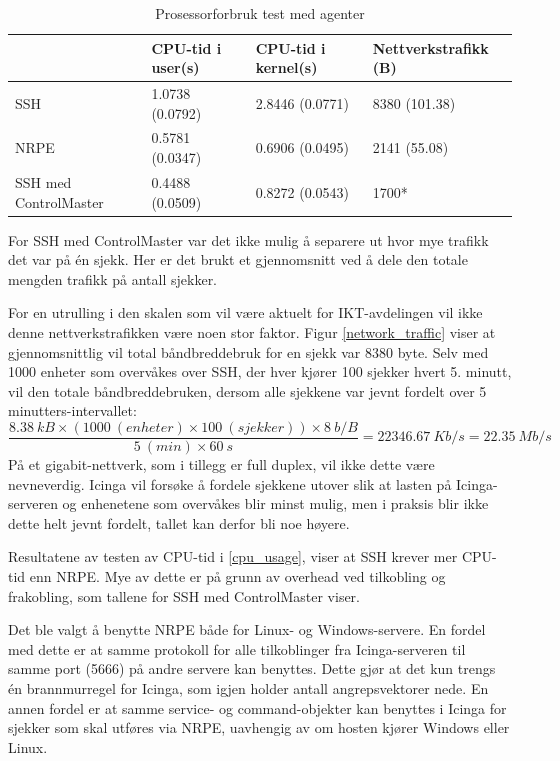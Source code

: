\begin{table}
    \begin{center}
	\begin{threeparttable}
    \begin{tabular}{| l | l | l | l |} \hline
	\ & \textbf{CPU-tid i user(s)} & \textbf{CPU-tid i kernel(s)} & \textbf{Nettverkstrafikk (B)} \\ \hline
	SSH & 1.0738 (0.0792) & 2.8446 (0.0771) & 8380 (101.38) \\ \hline
	NRPE & 0.5781 (0.0347) & 0.6906 (0.0495) & 2141 (55.08) \\ \hline
	SSH med ControlMaster & 0.4488 (0.0509) & 0.8272 (0.0543) & 1700* \\ \hline
	\end{tabular}
	\begin{tablenotes}
	\small
	\item *For SSH med ControlMaster var det ikke mulig å separere ut hvor mye trafikk det var på én sjekk. Her er det brukt et gjennomsnitt ved å dele den totale mengden trafikk på antall sjekker.
	\end{tablenotes}
	\caption{Prosessorforbruk test med agenter}
	\label{agentcheck}
	\end{threeparttable}
	\end{center}
\end{table}
For en utrulling i den skalen som vil være aktuelt for IKT-avdelingen vil ikke denne nettverkstrafikken være noen stor faktor. Figur \ref{network_traffic} viser at gjennomsnittlig vil total båndbreddebruk for en sjekk var 8380 byte. Selv med 1000 enheter som overvåkes over SSH, der hver kjører 100 sjekker hvert 5. minutt, vil den totale båndbreddebruken, dersom alle sjekkene var jevnt fordelt over 5 minutters-intervallet:
\[\frac{8.38\:kB\times(1000\:(enheter)\times100\:(sjekker))\times8\:b/B}{5\:(min)\times60\:s}=22346.67\:Kb/s = 22.35\:Mb/s \] 
På et gigabit-nettverk, som i tillegg er full duplex, vil ikke dette være nevneverdig. Icinga vil forsøke å fordele sjekkene utover slik at lasten på Icinga-serveren og enhenetene som overvåkes blir minst mulig\cite{icingascheduling}, men i praksis blir ikke dette helt jevnt fordelt, tallet kan derfor bli noe høyere.

Resultatene av testen av CPU-tid i \ref{cpu_usage}, viser at SSH krever mer CPU-tid enn NRPE. Mye av dette er på grunn av overhead ved tilkobling og frakobling, som tallene for SSH med ControlMaster viser. 

Det ble valgt å benytte NRPE både for Linux- og Windows-servere. En fordel med dette er at samme protokoll for alle tilkoblinger fra Icinga-serveren til samme port (5666) på andre servere kan benyttes. Dette gjør at det kun trengs én brannmurregel for Icinga, som igjen holder antall angrepsvektorer nede. En annen fordel er at samme service- og command-objekter kan benyttes i Icinga for sjekker som skal utføres via NRPE, uavhengig av om hosten kjører Windows eller Linux.
